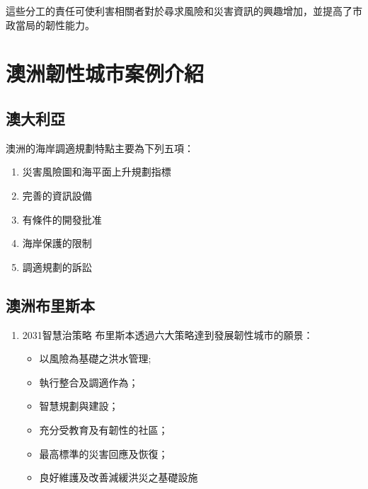 \documentclass[a4paper,12pt]{article}
\begin{document}
這些分工的責任可使利害相關者對於尋求風險和災害資訊的興趣增加，並提高了市政當局的韌性能力。\\
\newpage

\section{澳洲韌性城市案例介紹}
\label{sec:orgd282fd3}
\subsection{澳大利亞}
\label{sec:org69c0de5}
澳洲的海岸調適規劃特點主要為下列五項：\\
\begin{enumerate}
\item 災害風險圖和海平面上升規劃指標\\
\item 完善的資訊設備\\
\item 有條件的開發批准\\
\item 海岸保護的限制\\
\item 調適規劃的訴訟\\
\end{enumerate}

\subsection{澳洲布里斯本}
\label{sec:org7f6ef34}
\begin{enumerate}
\item 2031智慧治策略
\label{sec:org9d6edef}
布里斯本透過六大策略達到發展韌性城市的願景：\\
\begin{itemize}
\item 以風險為基礎之洪水管理;\\
\item 執行整合及調適作為；\\
\item 智慧規劃與建設；\\
\item 充分受教育及有韌性的社區；\\
\item 最高標準的災害回應及恢復；\\
\item 良好維護及改善減緩洪災之基礎設施\\
\end{itemize}
\end{enumerate}
\end{document}
